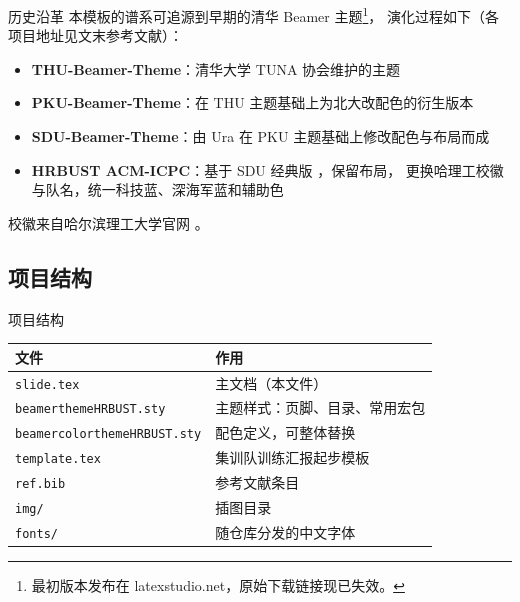 \documentclass[aspectratio=169]{beamer}
\begin{document}
\begin{frame}{历史沿革}
    本模板的谱系可追源到早期的清华 Beamer 主题\footnote{最初版本发布在 latexstudio.net，原始下载链接现已失效。}，
    演化过程如下（各项目地址见文末参考文献）：
    \begin{itemize}
        \item \textbf{THU-Beamer-Theme}：清华大学 TUNA 协会维护的主题 \cite{thu}
        \item \textbf{PKU-Beamer-Theme}：在 THU 主题基础上为北大改配色的衍生版本 \cite{pku}
        \item \textbf{SDU-Beamer-Theme}：由 Ura 在 PKU 主题基础上修改配色与布局而成 \cite{origin}
        \item \textbf{HRBUST ACM-ICPC}：基于 SDU 经典版 \cite{sdu}，保留布局，
              更换哈理工校徽与队名，统一科技蓝、深海军蓝和辅助色
    \end{itemize}
    校徽来自哈尔滨理工大学官网 \cite{hrbustlogo}。
\end{frame}

\subsection{项目结构}

\begin{frame}{项目结构}
    \begin{table}[h]
        \centering
        \begin{tabular}{ll}
            \toprule
            文件                         & 作用              \\
            \midrule
            \texttt{slide.tex}         & 主文档（本文件）        \\
            \texttt{beamerthemeHRBUST.sty}       & 主题样式：页脚、目录、常用宏包 \\
            \texttt{beamercolorthemeHRBUST.sty}  & 配色定义，可整体替换      \\
            \texttt{template.tex}      & 集训队训练汇报起步模板    \\
            \texttt{ref.bib}           & 参考文献条目          \\
            \texttt{img/}              & 插图目录            \\
            \texttt{fonts/}            & 随仓库分发的中文字体      \\
            \bottomrule
        \end{tabular}
    \end{table}
\end{frame}
\end{document}
